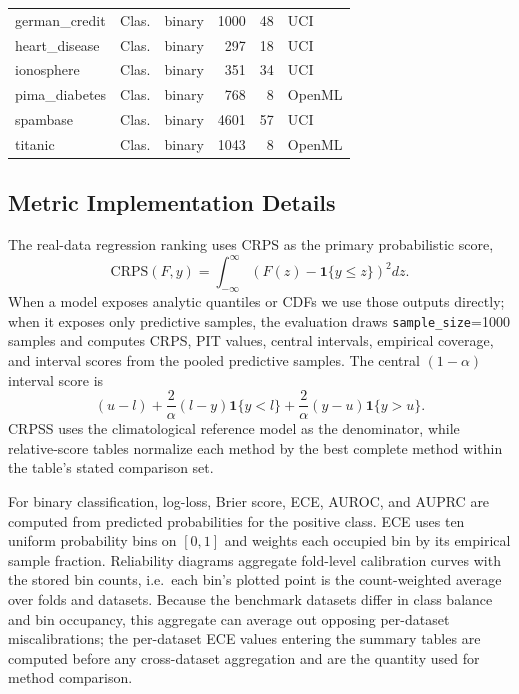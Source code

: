 \begin{landscape}
\begin{table}[!p]
\begin{tabular}{lllrrl}
german\_credit & Clas. & binary & 1000 & 48 & UCI \\
heart\_disease & Clas. & binary & 297 & 18 & UCI \\
ionosphere & Clas. & binary & 351 & 34 & UCI \\
pima\_diabetes & Clas. & binary & 768 & 8 & OpenML \\
spambase & Clas. & binary & 4601 & 57 & UCI \\
titanic & Clas. & binary & 1043 & 8 & OpenML \\
\bottomrule
\end{tabular}%
\end{table}
\end{landscape}

\subsection{Metric Implementation Details}\label{app:computational-setup-regression-metrics}\label{app:computational-setup-classification-metrics}

The real-data regression ranking uses CRPS \citep{gneiting2007strictly} as the primary probabilistic score,
\[
    \mathrm{CRPS}(F,y)=\int_{-\infty}^{\infty}\left(F(z)-\mathbf{1}\{y\le z\}\right)^2 dz.
\]
When a model exposes analytic quantiles or CDFs we use those outputs directly; when it exposes only predictive samples, the evaluation draws \texttt{sample\_size}=1000 samples and computes CRPS, PIT values, central intervals, empirical coverage, and interval scores from the pooled predictive samples. The central $(1-\alpha)$ interval score \citep{gneiting2007strictly} is
\[
    (u-l) + \frac{2}{\alpha}(l-y)\mathbf{1}\{y<l\}
    + \frac{2}{\alpha}(y-u)\mathbf{1}\{y>u\}.
\]
CRPSS uses the climatological reference model as the denominator, while relative-score tables normalize each method by the best complete method within the table's stated comparison set.

For binary classification, log-loss, Brier score, ECE, AUROC, and AUPRC are computed from predicted probabilities for the positive class. ECE uses ten uniform probability bins on $[0,1]$ and weights each occupied bin by its empirical sample fraction. Reliability diagrams aggregate fold-level calibration curves with the stored bin counts, i.e.\ each bin's plotted point is the count-weighted average over folds and datasets. Because the benchmark datasets differ in class balance and bin occupancy, this aggregate can average out opposing per-dataset miscalibrations; the per-dataset ECE values entering the summary tables are computed before any cross-dataset aggregation and are the quantity used for method comparison.
